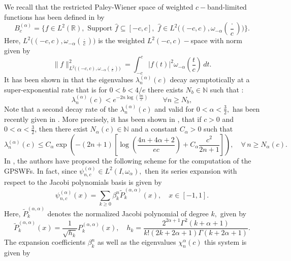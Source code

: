 \documentclass[]{article}
\newcommand{\J}{P^{(\alpha,\alpha)}}
\newcommand{\wJ}{\widetilde P^{(\alpha,\alpha)}}
\begin{document}
We recall that the restricted Paley-Wiener space of weighted $c-$band-limited functions has been defined in \cite{Karoui-Souabni1} by
\begin{equation}\label{GBc}
B_c^{(\alpha)}=\{ f\in L^2(\mathbb R),\,\,  \mbox{Support } \widehat f\subseteq [-c,c],\, \, \widehat f\in
L^2\big((-c,c), \omega_{- \alpha}(\frac{\cdot}{c})\big)\}.
\end{equation}
Here,  $L^2\big((-c,c), \omega_{- \alpha}(\frac{\cdot}{c})\big)$ is the weighted $L^2(-c,c)-$space with norm given by
$$\| f\|^2_{L^2\big((-c,c), \omega_{- \alpha}(\frac{\cdot}{c})\big)}= \int_{-c}^c |f(t)|^2 \omega_{-\alpha}\left(\frac{t}{c}\right)\, dt.$$
It has been shown in  \cite{Karoui-Souabni1} that the eigenvalues
$\lambda_n^{(\alpha)}(c)$ decay asymptotically at a super-exponential rate that is for $ 0<b<4/e$ there exists $N_b \in \mathbb{N}$ such that :
\begin{equation} \label{decaylambda0}
\lambda_n^{(\alpha)}(c) < e^{-2n \log(\frac{bn}{c})} \qquad \forall n \geq N_b,
\end{equation}
Note that a second decay rate of the  $ \lambda_n^{(\alpha)}(c)$ and valid for $0<\alpha <\frac{3}{2},$ has been recently given  in \cite{Karoui-Souabni2}. More precisely, it has been shown in \cite{Karoui-Souabni2}, that if  $c>0$ and $0<\alpha <\frac{3}{2}$, then there exist
$N_{\alpha}(c)\in \mathbb N$ and a constant $C_{\alpha}>0$ such that
\begin{equation}
\label{decay_lambda2}
\lambda_n^{(\alpha)}(c) \leq C_{\alpha} \exp\left(-(2n+1)\left[ \log\left(\frac{4n+4\alpha+2}{e c}\right)+ C_{\alpha} \frac{c^2}{2n+1}\right]\right),\quad
\forall\, n\geq N_{\alpha}(c).
\end{equation}
In \cite{Karoui-Souabni1}, the authors have proposed the following  scheme for the computation of the GPSWFs. In fact,   since  $\psi^{(\alpha)}_{n,c}\in L^2(I, \omega_{\alpha}),$ then its series expansion
with respect to the Jacobi polynomials basis is given by
\begin{equation}\label{expansion1}
\psi^{(\alpha)}_{n,c}(x) =\sum_{k\geq 0} \beta_k^n \wJ_k (x),\quad x\in [-1,1].
\end{equation}
Here, $\wJ_k$ denotes the normalized Jacobi polynomial of degree $k,$ given by
\begin{equation}\label{JacobiP}
\wJ_{k}(x)= \frac{1}{\sqrt{h_k}}\J_k(x),\quad h_k=\frac{2^{2\alpha+1}\Gamma^2(k+\alpha+1)}{k!(2k+2\alpha+1)\Gamma(k+2\alpha+1)}.
\end{equation}
The expansion coefficients $\beta_k^n$ as well as the eigenvalues $\chi_n^\alpha(c)$  this system is given by
\end{document}
